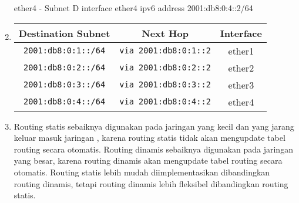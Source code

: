 \begin{enumerate}
	ether4 - Subnet D
	interface ether4
	ipv6 address 2001:db8:0:4::2/64
	\item
    \begin{center}
    \begin{tabular}{|c|c|c|}
    \hline
    \textbf{Destination Subnet} & \textbf{Next Hop} & \textbf{Interface}  \\
    \hline
	\texttt{2001:db8:0:1::/64} & \texttt{via 2001:db8:0:1::2} & ether1 \\
	\texttt{2001:db8:0:2::/64} & \texttt{via 2001:db8:0:2::2} & ether2 \\
	\texttt{2001:db8:0:3::/64} & \texttt{via 2001:db8:0:3::2} & ether3 \\
	\texttt{2001:db8:0:4::/64} & \texttt{via 2001:db8:0:4::2} & ether4 \\
    \hline
    \end{tabular}
    \label{tab:routing}
    \end{center}
	\item Routing statis sebaiknya digunakan pada jaringan yang kecil dan yang jarang keluar masuk jaringan
		, karena routing statis tidak akan mengupdate tabel routing secara otomatis. Routing dinamis sebaiknya digunakan pada jaringan yang besar,
		karena routing dinamis akan mengupdate tabel routing secara otomatis. Routing statis lebih mudah diimplementasikan
		dibandingkan routing dinamis, tetapi routing dinamis lebih fleksibel dibandingkan routing statis.
\end{enumerate}